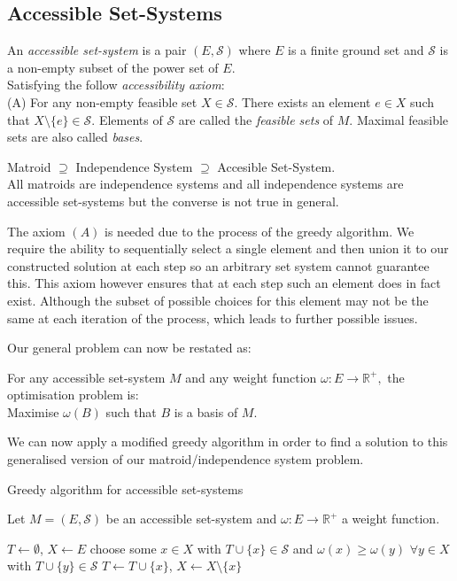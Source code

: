 \documentclass[../main.tex]{subfiles}
\begin{document}
\subsection{Accessible Set-Systems}
\begin{defn}
An \textit{accessible set-system} is a pair $(E,\mathcal{S})$ where $E$ is a finite ground set and $\mathcal{S}$ is a non-empty subset of the power set of $E.$\\
Satisfying the follow \textit{accessibility axiom}:\\
(A) For any non-empty feasible set $X \in \mathcal{S}.$ There exists an element $e \in X$ such that $X \setminus \{e\} \in \mathcal{S}.$
Elements of $\mathcal{S}$ are called the \textit{feasible sets} of $M.$ Maximal feasible sets are also called \textit{bases}.
\end{defn}

\begin{rem}
Matroid $\supseteq$ Independence System $\supseteq$ Accesible Set-System.\\
All matroids are independence systems and all independence systems are accessible set-systems but the converse is not true in general.
\end{rem}

\noindent The axiom $(A)$ is needed due to the process of the greedy algorithm. We require the ability to sequentially select a single element and then union it to our constructed solution at each step so an arbitrary set system cannot guarantee this. This axiom however ensures that at each step such an element does in fact exist. Although the subset of possible choices for this element may not be the same at each iteration of the process, which leads to further possible issues.

\noindent Our general problem can now be restated as:
\begin{prop}
For any accessible set-system $M$ and any weight function $\omega:E \longrightarrow \mathbb{R^+},$ the optimisation problem is:\\
 Maximise $\omega(B)$ such that $B$ is a basis of $M.$
\end{prop}
\noindent We can now apply a modified greedy algorithm in order to find a solution to this generalised version of our matroid/independence system problem.

\begin{algorithm}[H]
\caption{Greedy algorithm for accessible set-systems}\label{modified_greedy}
Let $M=(E,\mathcal{S})$ be an accessible set-system and $\omega:E \longrightarrow \mathbb{R^+}$ a weight function.
\begin{algorithmic}[1]
\State $T \gets \emptyset$, $X \gets E$
\State choose some $x \in X$ with $T \cup \{x\} \in \mathcal{S}$ and
\State $\omega(x) \geq \omega(y)$ $\forall y \in X$ with $T \cup \{y\} \in \mathcal{S}$
\State $T \gets T \cup \{x\}$, $X \gets X \setminus \{x\}$
\EndWhile
\EndProcedure
\end{algorithmic}
\end{algorithm}
\end{document}

